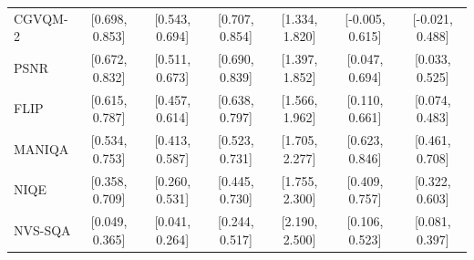 \begin{tabular}{l|cccc|cc}
CGVQM-2 & [0.698, 0.853] & [0.543, 0.694] & [0.707, 0.854] & [1.334, 1.820] & [-0.005, 0.615] & [-0.021, 0.488] \\
PSNR & [0.672, 0.832] & [0.511, 0.673] & [0.690, 0.839] & [1.397, 1.852] & [0.047, 0.694] & [0.033, 0.525] \\
FLIP & [0.615, 0.787] & [0.457, 0.614] & [0.638, 0.797] & [1.566, 1.962] & [0.110, 0.661] & [0.074, 0.483] \\
MANIQA & [0.534, 0.753] & [0.413, 0.587] & [0.523, 0.731] & [1.705, 2.277] & [0.623, 0.846] & [0.461, 0.708] \\
NIQE & [0.358, 0.709] & [0.260, 0.531] & [0.445, 0.730] & [1.755, 2.300] & [0.409, 0.757] & [0.322, 0.603] \\
NVS-SQA & [0.049, 0.365] & [0.041, 0.264] & [0.244, 0.517] & [2.190, 2.500] & [0.106, 0.523] & [0.081, 0.397] \\
\hline
\end{tabular}
